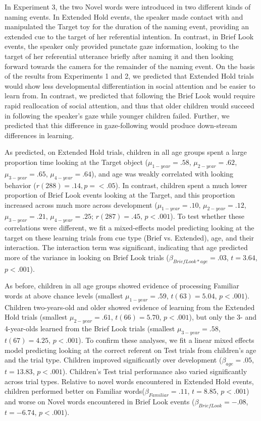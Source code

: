 \documentclass[man,floatsintext]{apa6}
\begin{document}
In Experiment 3, the two Novel words were introduced in two different kinds of naming events. In Extended Hold events, the speaker made contact with and manipulated the Target toy for the duration of the naming event, providing an extended cue to the target of her referential intention. In contrast, in Brief Look events, the speaker only provided punctate gaze information, looking to the target of her referential utterance briefly after naming it and then looking forward towards the camera for the remainder of the naming event. On the basis of the results from Experiments 1 and 2, we predicted that Extended Hold trials would show less developmental differentiation in social attention and be easier to learn from. In contrast, we predicted that following the Brief Look would require rapid reallocation of social attention, and thus that older children would succeed in following the speaker's gaze while younger children failed. Further, we predicted that this difference in gaze-following would produce down-stream differences in learning.

As predicted, on Extended Hold trials, children in all age groups spent a large proportion time looking at the Target object ($\mu_{1-year} = .58$, $\mu_{2-year} = .62$, $\mu_{3-year} = .65$, $\mu_{4-year} = .64$), and age was weakly correlated with looking behavior ($r(288) = .14, p = <.05$). In contrast, children spent a much lower proportion of Brief Look events looking at the Target, and this proportion increased across much more across development ($\mu_{1-year} = .10$, $\mu_{2-year} = .12$, $\mu_{3-year} = .21$, $\mu_{4-year} = .25$; $r(287) = .45$, $p < .001$). To test whether these correlations were different, we fit a mixed-effects model predicting looking at the target on these learning trials from cue type (Brief vs. Extended), age, and their interaction. The interaction term was significant, indicating that age predicted more of the variance in looking on Brief Look trials ($\beta_{Brief Look * age} = .03$, $t = 3.64$, $p < . 001$).

As before, children in all age groups showed evidence of processing Familiar words at above chance levels (smallest $\mu_{1-year} = .59$, $t(63) = 5.04$, $p < .001$). Children two-years-old and older showed evidence of learning from the Extended Hold trials (smallest $\mu_{2-year} = .61$, $t(66) = 5.70$, $p < .001$), but only the 3- and 4-year-olds learned from the Brief Look trials (smallest $\mu_{3-year} = .58$, $t(67) = 4.25$, $p < .001$). To confirm these analyses, we fit a linear mixed effects model predicting looking at the correct referent on Test trials from children's age and the trial type. Children improved significantly over development ($\beta_{age} = .05$, $t = 13.83$, $p < .001$). Children's Test trial performance also varied significantly across trial types. Relative to novel words encountered in Extended Hold events, children performed better on Familiar words($\beta_{Familiar} = .11$, $t = 8.85$, $p < .001$) and worse on Novel words encountered in Brief Look events ($\beta_{Brief Look} = -.08$, $t = -6.74$, $p < .001$).
\end{document}
